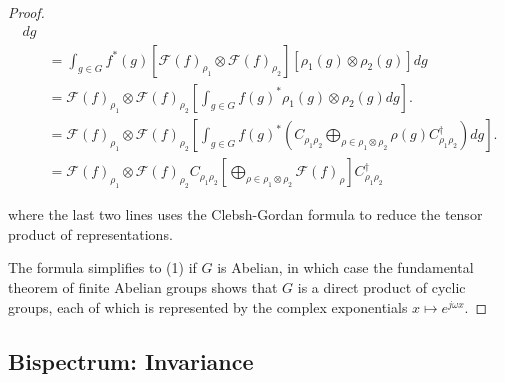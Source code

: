 \documentclass{article}
\begin{document}
\begin{proof}
\begin{align*}
    dg \\
&= \int_{g \in G}
    f^*(g)
    [\mathcal{F}(f)_{\rho_1} \otimes \mathcal{F}(f)_{\rho_2}]\left[\rho_1(g) \otimes \rho_2(g)\right]
    dg\\
&=
\mathcal{F}(f)_{\rho_1} \otimes \mathcal{F}(f)_{\rho_2}
    \left[
        \int_{g \in G} f(g)^* \rho_1(g) \otimes \rho_2(g) dg
    \right].\\
&=
\mathcal{F}(f)_{\rho_1} \otimes \mathcal{F}(f)_{\rho_2}
    \left[
        \int_{g \in G} f(g)^*  \left( C_{\rho_1 \rho_2} \bigoplus_{\rho \in \rho_1 \otimes \rho_2} \rho(g) C_{\rho_1 \rho_2}^{\dagger}\right) dg
    \right].\\
& =
\mathcal{F}(f)_{\rho_1} \otimes \mathcal{F}(f)_{\rho_2} C_{\rho_1 \rho_2} \left[ \bigoplus_{\rho \in \rho_1 \otimes \rho_2} \mathcal{F}(f)_{\rho} \right]  C_{\rho_1 \rho_2}^{\dagger}
\end{align*}

where the last two lines uses the Clebsh-Gordan formula to reduce the tensor product of representations.


The formula simplifies to (1) if $G$ is Abelian, in which case the fundamental theorem of finite Abelian groups shows that $G$ is a direct product of cyclic groups, each of which is represented by the complex exponentials $x \mapsto e^{j \omega x}$.

\end{proof}


\subsection{Bispectrum: Invariance}
\end{document}
